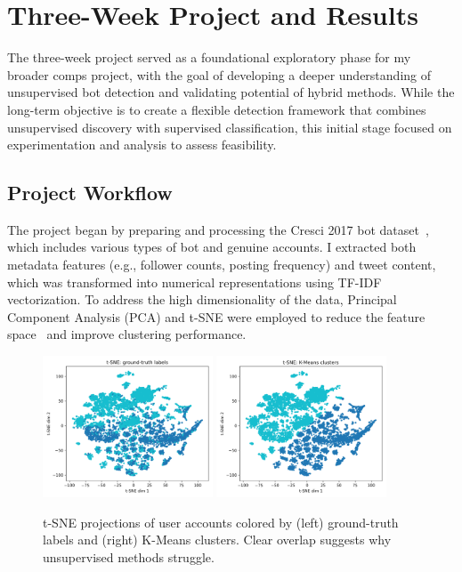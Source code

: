 \documentclass[10pt,twocolumn]{article}
\begin{document}
\section{Three-Week Project and Results}

The three-week project served as a foundational exploratory phase for my broader comps project, with the goal of developing a deeper understanding of unsupervised bot detection and validating potential of hybrid methods. While the long-term objective is to create a flexible detection framework that combines unsupervised discovery with supervised classification, this initial stage focused on experimentation and analysis to assess feasibility.

\subsection{Project Workflow}

The project began by preparing and processing the Cresci 2017 bot dataset~\cite{cresci2017paradigm}, which includes various types of bot and genuine accounts. I extracted both metadata features (e.g., follower counts, posting frequency) and tweet content, which was transformed into numerical representations using TF-IDF vectorization. To address the high dimensionality of the data, Principal Component Analysis (PCA) and t-SNE were employed to reduce the feature space~\cite{van2008visualizing} and improve clustering performance.

\begin{figure}[ht]
    \centering
    \includegraphics[width=0.45\textwidth]{tsne_ground_truth.png}
    \includegraphics[width=0.45\textwidth]{tsne_kmeans.png}
    \caption{t-SNE projections of user accounts colored by (left) ground-truth labels and (right) K-Means clusters. Clear overlap suggests why unsupervised methods struggle.}
    \label{fig:tsne}
\end{figure}
\end{document}
